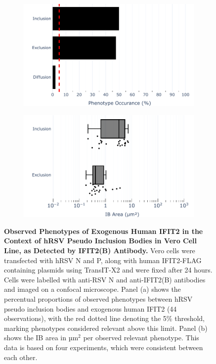 \begin{figure}
    \begin{subfigure}{0.495\textwidth}
        \caption{}
        \includegraphics[width=1\linewidth]{09. Chapter 4/Figs/01. pIB/03. IFIT2/04. IFIT2-FLAG/02. IFIT2B/01. bar_i2b_hnhp.pdf}
    \end{subfigure}
    \begin{subfigure}{0.495\textwidth}
        \caption{}
        \includegraphics[width=1\linewidth]{09. Chapter 4/Figs/01. pIB/03. IFIT2/04. IFIT2-FLAG/02. IFIT2B/02. box_i2a_hnhp.pdf}
    \end{subfigure}
    \caption[Observed Phenotypes of Exogenous Human IFIT2 in the Context of hRSV Pseudo Inclusion Bodies in Vero Cell Line, as Detected by IFIT2(B) Antibody.]{\textbf{Observed Phenotypes of Exogenous Human IFIT2 in the Context of hRSV Pseudo Inclusion Bodies in Vero Cell Line, as Detected by IFIT2(B) Antibody.} Vero cells were transfected with hRSV N and P, along with human IFIT2-FLAG containing plasmids using TransIT-X2 and were fixed after 24 hours. Cells were labelled with anti-RSV N and anti-IFIT2(B) antibodies and imaged on a confocal microscope. Panel (a) shows the percentual proportions of observed phenotypes between hRSV pseudo inclusion bodies and exogenous human IFIT2 (44 observations), with the red dotted line denoting the 5\% threshold, marking phenotypes considered relevant above this limit. Panel (b) shows the IB area in \(\mbox{µm}^2\) per observed relevant phenotype. This data is based on four experiments, which were consistent between each other.
}
\end{figure}
